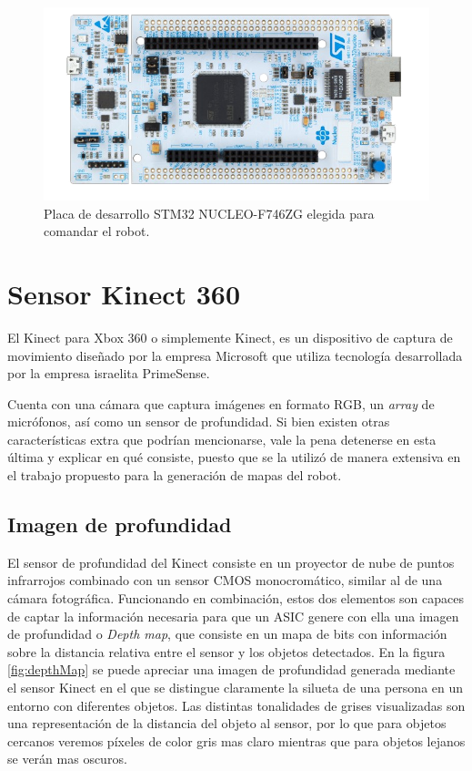 \begin{figure}[ht]
    \centering
    \includegraphics[scale=1.5]{./Figures/stm32nucleo.png}
    \caption{Placa de desarrollo STM32 NUCLEO-F746ZG elegida para comandar el robot.\protect\footnotemark}
    \label{fig:stm32nucleo}
\end{figure}


\section{Sensor Kinect 360}

El Kinect para Xbox 360 o simplemente Kinect, es un dispositivo de captura de movimiento diseñado por la empresa Microsoft que utiliza tecnología desarrollada por la empresa israelita PrimeSense.

Cuenta con una cámara que captura imágenes en formato RGB, un \textit{array} de micrófonos, así como un sensor de profundidad. Si bien existen otras características extra que podrían mencionarse, vale la pena detenerse en esta última y explicar en qué consiste, puesto que se la utilizó de manera extensiva en el trabajo propuesto para la generación de mapas del robot.

\subsection{Imagen de profundidad}

El sensor de profundidad del Kinect consiste en un proyector de nube de puntos infrarrojos combinado con un sensor CMOS monocromático, similar al de una cámara fotográfica. Funcionando en combinación, estos dos elementos son capaces de captar la información necesaria para que un ASIC genere con ella una imagen de profundidad o \textit{Depth map}, que consiste en un mapa de bits con información sobre la distancia relativa entre el sensor y los objetos detectados. En la figura \ref{fig:depthMap} se puede apreciar una imagen de profundidad generada mediante el sensor Kinect en el que se distingue claramente la silueta de una persona en un entorno con diferentes objetos. Las distintas tonalidades de grises visualizadas son una representación de la distancia del objeto al sensor, por lo que para objetos cercanos veremos píxeles de color gris mas claro mientras que para objetos lejanos se verán mas oscuros.


